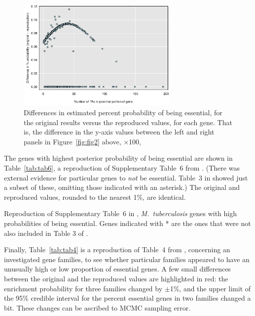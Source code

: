 \begin{figure}
\centering
\includegraphics[width=0.7\textwidth]{../reproduction/Figs/fig2_diff.pdf}

\caption{Differences in estimated percent probability of being
essential, for the original results versus the reproduced values, for
each gene. That is, the difference in the y-axis values between the
left and right panels in Figure~\ref{fig:fig2} above,
$\times$100, \label{fig:fig2diff}}
\end{figure}


The genes with highest posterior probability of being essential are
shown in Table~\ref{tab:tab6}, a reproduction of Supplementary Table~6
from \citet{lamichhane2003}.
(There was external evidence for particular genes to \emph{not\/} be
essential. Table~3 in \citet{lamichhane2003} showed just a subset of
these, omitting those indicated with an asterisk.) The original and
reproduced values, rounded to the nearest 1\%, are identical.

\begin{table}
\caption{Reproduction of Supplementary Table~6 in \citet{lamichhane2003},
\emph{M.\ tuberculosis\/} genes with high probabilities of being
essential. Genes indicated with * are the ones that were not also
included in Table 3 of \citet{lamichhane2003}.\label{tab:tab6}}

\centering

\end{table}

Finally, Table~\ref{tab:tab4} is a reproduction of Table~4
from \citet{lamichhane2003}, concerning an investigated gene families,
to see whether particular families appeared to have an unusually high
or low proportion of essential genes. A few small differences between
the original and the reproduced values are highlighted in red: the
enrichment probability for three families changed by $\pm$1\%,
and the upper limit of the 95\% credible interval for the percent
essential genes in two families changed a bit. These changes can be
ascribed to MCMC sampling error.

